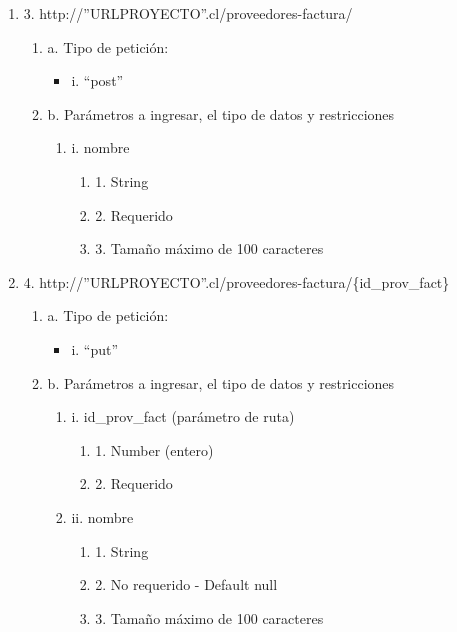 \begin{enumerate}
    \item 3. http://”URLPROYECTO”.cl/proveedores-factura/
    \begin{enumerate}
        \item a. Tipo de petición:
            \begin{itemize}
               \item i. “post”
            \end{itemize}
        \item b. Parámetros a ingresar, el tipo de datos y restricciones
            \begin{enumerate}
                \item i. nombre
                    \begin{enumerate}
                        \item 1. String
                        \item 2. Requerido
                        \item 3. Tamaño máximo de 100 caracteres
                    \end{enumerate}
            \end{enumerate}
    \end{enumerate}

    \item 4. http://”URLPROYECTO”.cl/proveedores-factura/\{id\_prov\_fact\}
    \begin{enumerate}
        \item a. Tipo de petición:
            \begin{itemize}
               \item i. “put”
            \end{itemize}
        \item b. Parámetros a ingresar, el tipo de datos y restricciones
            \begin{enumerate}
                \item i. id\_prov\_fact (parámetro de ruta)
                    \begin{enumerate}
                        \item 1. Number (entero)
                        \item 2. Requerido
                    \end{enumerate}
                \item ii. nombre
                    \begin{enumerate}
                        \item 1. String
                        \item 2. No requerido - Default null
                        \item 3. Tamaño máximo de 100 caracteres
                    \end{enumerate}
            \end{enumerate}
    \end{enumerate}


\end{enumerate}
